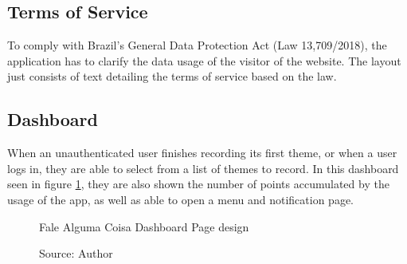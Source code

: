 \subsection{Terms of Service}

To comply with Brazil's General Data Protection Act (Law 13,709/2018), the application has to clarify the data usage of the visitor of the website. The layout just consists of text detailing the terms of service based on the law.

\subsection{Dashboard}

When an unauthenticated user finishes recording its first theme, or when a user logs in, they are able to select from a list of themes to record. In this dashboard seen in figure \ref{fig:falealgumacoisa-dashboard-page-design}, they are also shown the number of points accumulated by the usage of the app, as well as able to open a menu and notification page.

\begin{figure}[ht]
    \centering
    \caption{Fale Alguma Coisa Dashboard Page design}
    \caption*{Source: Author}
    \label{fig:falealgumacoisa-dashboard-page-design}
\end{figure}

